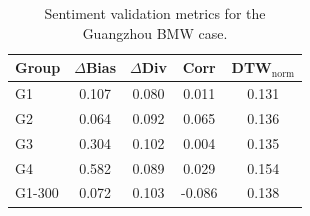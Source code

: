 \begin{table}[t]
\centering
\caption{Sentiment validation metrics for the Guangzhou BMW case.}
\label{tab:guangzhou_metrics}
\begin{tabular}{lcccc}
\toprule
Group & $\Delta$Bias & $\Delta$Div & Corr & DTW$_{\mathrm{norm}}$ \\
\midrule
G1 & 0.107 & 0.080 & 0.011 & 0.131 \\
G2 & 0.064 & 0.092 & 0.065 & 0.136 \\
G3 & 0.304 & 0.102 & 0.004 & 0.135 \\
G4 & 0.582 & 0.089 & 0.029 & 0.154 \\
G1-300 & 0.072 & 0.103 & -0.086 & 0.138 \\
\bottomrule
\end{tabular}
\end{table}
